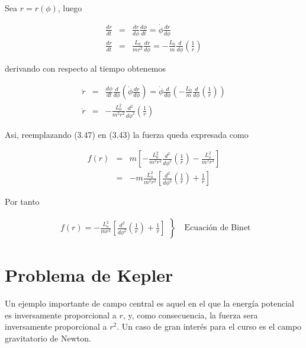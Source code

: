 \documentclass[12pt]{report}
\begin{document}
Sea $r=r(\phi)$, luego

\begin{eqnarray}
\frac{dr}{dt} &=& \frac{dr}{d\phi} \frac{d\phi}{dt} = \dot{\phi} \frac{dr}{d\phi}  \\
\frac{dr}{dt} &=& \frac{L_0}{mr^2} \frac{dr}{d\phi} = - \frac{L_0}{m} \frac{d}{d\phi} \left( \frac{1}{r} \right)
\end{eqnarray}

derivando con respecto al tiempo obtenemos

\begin{eqnarray}
\ddot{r} &=& \frac{d\phi}{dt} \frac{d}{d\phi} \left( \dot{\phi} \frac{dr}{d\phi} \right) = \dot{\phi} \frac{d}{d\phi} \left( -\frac{L_0}{m} \frac{d}{d\phi} \left( \frac{1}{r} \right) \right)  \\
\ddot{r}&=&  -\frac{L_0^2}{m^2 r^2} \frac{d^2}{d\phi^2} \left( \frac{1}{r} \right)  
\end{eqnarray}

Asi, reemplazando (3.47) en (3.43) la fuerza queda expresada como 

\begin{eqnarray}
f(r)&=&m \left[  -\frac{L_0^2}{m^2 r^2} \frac{d^2}{d\phi^2} \left( \frac{1}{r} \right)  - \frac{L_o^2}{m^2 r^3} \right] \\
&=& -m\frac{L_o^2}{m^2 r^2} \left[ \frac{d^2}{d\phi^2} \left( \frac{1}{r} \right) + \frac{1}{r} \right]
\end{eqnarray}

Por tanto

\begin{eqnarray}
\left.
\begin{matrix}
\displaystyle f(r)=-\frac{L_o^2}{m r^2} \left[ \frac{d^2}{d\phi^2} \left( \frac{1}{r} \right) + \frac{1}{r} \right]
\end{matrix}
\right\}
\quad \mbox{Ecuación de Binet}
\end{eqnarray}














\section{Problema de Kepler}


Un ejemplo importante de campo central es aquel en el que la energía potencial es inversamente proporcional a $r$, y, como consecuencia, la fuerza sera inversamente proporcional a $r^2$. Un caso de gran interés para el curso es el campo gravitatorio de Newton. \\
\end{document}
